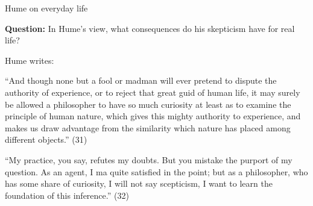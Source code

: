 \documentclass[8pt]{beamer}\usepackage[]{graphicx}\usepackage[]{color}
\begin{document}
\begin{frame}{Hume on everyday life}

\textbf{Question:}  In Hume's view, what consequences do his skepticism
have for real life?

\pause
Hume writes:

\begin{addmargin}[2em]{2em}%
    ``And though none but a fool or madman will ever pretend to dispute
    the authority of experience, or to reject that great guid of
    human life, it may surely be allowed a philosopher to have so
    much curiosity at least as to examine the principle of human
    nature, which gives this mighty authority to experience,
    and makes us draw advantage from the similarity which nature
    has placed among different objects.'' (31)
\end{addmargin}

\begin{addmargin}[2em]{2em}%
    ``My practice, you say, refutes my doubts.  But you mistake the
    purport of my question.  As an agent, I ma quite satisfied in the
    point; but as a philosopher, who has some share of curiosity,
    I will not say scepticism, I want to learn the foundation of this
    inference.'' (32)
\end{addmargin}



\end{frame}


\end{document}

